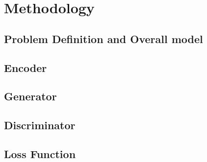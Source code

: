 \documentclass[10pt,twocolumn,letterpaper]{article}
\begin{document}
\section{Methodology}

\subsection{Problem Definition and Overall model}\label{3.1}


\subsection{Encoder}\label{3.2}

\subsection{Generator}\label{3.3}

\subsection{Discriminator}\label{3.4}

\subsection{Loss Function}\label{3.5}



\end{document}
